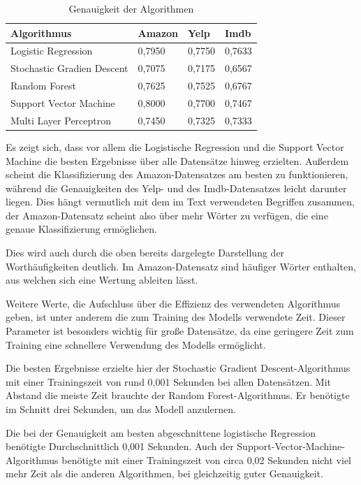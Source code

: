 \documentclass[a4paper,12pt]{article}
\begin{document}
\begin{table}[h]
\centering
\begin{tabular}{|l|lll|}
\hline
\textbf{Algorithmus} & \textbf{Amazon} & \textbf{Yelp} & \textbf{Imdb} \\
\hline
Logistic Regression & 0,7950 & 0,7750 & 0,7633 \\
Stochastic Gradien Descent & 0,7075 & 0,7175 & 0,6567 \\
Random Forest & 0,7625 & 0,7525 & 0,6767 \\
Support Vector Machine & 0,8000 & 0,7700 & 0,7467 \\
Multi Layer Perceptron & 0,7450 & 0,7325 & 0,7333 \\

\hline
\end{tabular}
\caption{Genauigkeit der Algorithmen}
\label{accuracy}
\end{table}

Es zeigt sich, dass vor allem die Logistische Regression und die Support Vector Machine die besten Ergebnisse über alle Datensätze hinweg erzielten. Außerdem scheint die Klassifizierung des Amazon-Datensatzes am besten zu funktionieren, während die Genauigkeiten des Yelp- und des Imdb-Datensatzes leicht darunter liegen. Dies hängt vermutlich mit dem im Text verwendeten Begriffen zusammen, der Amazon-Datensatz scheint also über mehr Wörter zu verfügen, die eine genaue Klassifizierung ermöglichen. 

Dies wird auch durch die oben bereits dargelegte Darstellung der Worthäufigkeiten deutlich. Im Amazon-Datensatz sind häufiger Wörter enthalten, aus welchen sich eine Wertung ableiten lässt. 

Weitere Werte, die Aufschluss über die Effizienz des verwendeten Algorithmus geben, ist unter anderem die zum Training des Modells verwendete Zeit. Dieser Parameter ist besonders wichtig für große Datensätze, da eine geringere Zeit zum Training eine schnellere Verwendung des Modells ermöglicht. 

Die besten Ergebnisse erzielte hier der Stochastic Gradient Descent-Algorithmus mit einer Trainingszeit von rund 0,001 Sekunden bei allen Datensätzen. Mit Abstand die meiste Zeit brauchte der Random Forest-Algorithmus. Er benötigte im Schnitt drei Sekunden, um das Modell anzulernen. 

Die bei der Genauigkeit am besten abgeschnittene logistische Regression benötigte Durchschnittlich 0,001 Sekunden. Auch der Support-Vector-Machine-Algorithmus benötigte mit einer Trainingszeit von circa 0,02 Sekunden nicht viel mehr Zeit als die anderen Algorithmen, bei gleichzeitig guter Genauigkeit.
\end{document}
